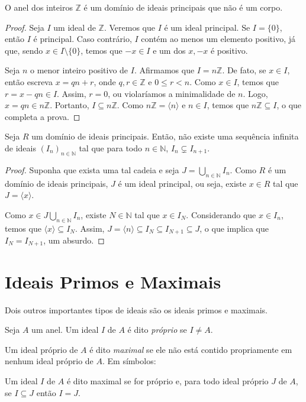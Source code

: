 \begin{prop} O anel dos inteiros $\mathbb Z$ é um domínio de ideais principais que não é um corpo.
\end{prop}
\begin{proof}
    Seja $I$ um ideal de $\mathbb Z$.
    Veremos que $I$ é um ideal principal.
    Se $I=\{0\}$, então $I$ é principal.
    Caso contrário, $I$ contém ao menos um elemento positivo, já que, sendo $x\in I\setminus\{0\}$, temos que $-x \in I$ e um dos $x, -x$ é positivo.

    Seja $n$ o menor inteiro positivo de $I$.
    Afirmamos que $I=n\mathbb Z$.
    De fato, se $x \in I$, então escreva $x=qn+r$, onde $q,r \in \mathbb Z$ e $0\leq r<n$.
    Como $x \in I$, temos que $r=x-qn \in I$. Assim, $r=0$, ou violaríamos a minimalidade de $n$.
    Logo, $x=qn\in n\mathbb Z$.
    Portanto, $I\subseteq n\mathbb Z$.
    Como $n\mathbb Z=\langle n\rangle$ e $n \in I$, temos que $n\mathbb Z\subseteq I$, o que completa a prova.
\end{proof}

\begin{prop}
    Seja $R$ um domínio de ideais principais.
    Então, não existe uma sequência infinita de ideais $(I_n)_{n \in \mathbb N}$ tal que para todo $n \in \mathbb N$, $I_n\subsetneq I_{n+1}$.
\end{prop}
\begin{proof}
    Suponha que exista uma tal cadeia e seja $J=\bigcup_{n \in \mathbb N} I_n$.
    Como $R$ é um domínio de ideais principais, $J$ é um ideal principal, ou seja, existe $x \in R$ tal que $J=\langle x\rangle$.
    
    Como $x \in J\bigcup_{n \in \mathbb N}I_n$, existe $N \in \mathbb N$ tal que $x \in I_N$.
    Considerando que $x \in I_n$, temos que $\langle x\rangle \subseteq I_N$.
    Assim, $J=\langle n\rangle \subseteq I_N\subseteq I_{N+1}\subseteq J$, o que implica que $I_N=I_{N+1}$, um absurdo.
\end{proof}

\section{Ideais Primos e Maximais}
Dois outros importantes tipos de ideais são os ideais primos e maximais.

\begin{definition}
Seja $A$ um anel.
Um ideal $I$ de $A$ é dito \emph{próprio} se $I\neq A$.

Um ideal próprio de $A$ é dito \emph{maximal} se ele não está contido propriamente em nenhum ideal próprio de $A$.
Em símbolos:

Um ideal $I$ de $A$ é dito maximal se for próprio e, para todo ideal próprio $J$ de $A$, se $I\subseteq J$ então $I=J$.
\end{definition}

